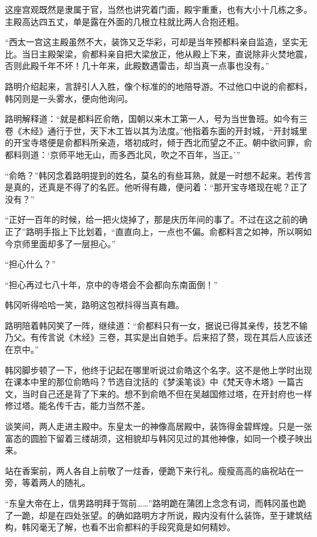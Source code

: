 这座宫观既然是隶属于官，当然也讲究着门面，殿宇重重，也有大小十几栋之多。主殿高达四五丈，单是露在外面的几根立柱就比两人合抱还粗。

“西太一宫这主殿虽然不大，装饰又乏华彩，可却是当年预都料亲自监造，坚实无比。当日主殿架梁，俞都料亲自把大梁放正，他从殿上下来，直说除非火焚地震，否则此殿千年不坏！几十年来，此殿数遇雷击，却当真一点事也没有。”

路明介绍起来，言辞引人入胜，像个标准的的地陪导游。不过他口中说的俞都料，韩冈则是一头雾水，便向他询问。

路明解释道：“就是都料匠俞皓，国朝以来木工第一人，号为当世鲁班。如今有三卷《木经》通行于世，天下木工皆以其为法度。”他指着东面的开封城，“开封城里的开宝寺塔便是俞都料所亲造，塔初成时，倾于西北而望之不正。朝中欲问罪，俞都料则道：‘京师平地无山，而多西北风，吹之不百年，当正。’”

“俞皓？”韩冈念着路明提到的姓名，莫名的有些耳熟，就是一时想不起来。若传言是真的，还真是不得了的名匠。他听得有趣，便问着：“那开宝寺塔现在呢？正了没有？”

“正好一百年的时候，给一把火烧掉了，那是庆历年间的事了。不过在这之前的确正了”路明手指上下比划着，“直直向上，一点也不偏。俞都料言之如神，所以啊如今京师里面却多了一层担心。”

“担心什么？”

“担心再过七八十年，京中的寺塔会不会都向东南面倒！”

韩冈听得哈哈一笑，路明这包袱抖得当真有趣。

路明陪着韩冈笑了一阵，继续道：“俞都料只有一女，据说已得其亲传，技艺不输乃父。有传言说《木经》三卷，其实是出自她手。后来招了赘，现在其后人应该还在京中。”

韩冈脚步顿了一下，他终于记起在哪里听说过俞皓这个名字。这不是他上学时出现在课本中里的那位俞皓吗？节选自沈括的《梦溪笔谈》中《梵天寺木塔》一篇古文，当时自己还是背了下来的。想不到俞皓不但在吴越国修过塔，在开封府也一样修过塔。能名传千古，能力当然不差。

谈笑间，两人走进主殿中。东皇太一的神像高居殿中，装饰得金碧辉煌。只是一张富态的圆脸下留着三缕胡须，这相貌却与韩冈见过的其他神像，如同一个模子映出来。

站在香案前，两人各自上前敬了一炷香，便跪下来行礼。瘦瘦高高的庙祝站在一旁，等着两人的随礼。

“东皇大帝在上，信男路明拜于驾前……”路明跪在蒲团上念念有词，而韩冈虽也跪了一跪，却是在四处张望。的确如路明方才所说，殿内没有什么装饰，至于建筑结构，韩冈毫无了解，也看不出俞都料的手段究竟是如何精妙。

